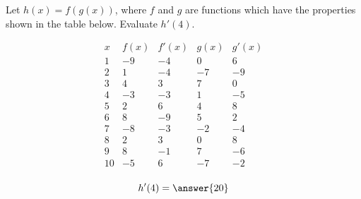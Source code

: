 \documentclass{ximera}
\author{Steven Gubkin}
\begin{document}
\begin{exercise}


Let $h(x) = f(g(x))$, where $f$ and $g$ are functions which have the properties shown in the table below.  Evaluate $h'(4)$.

\[
\begin{array}{c|c|c|c|c}
 x & f(x) & f'(x) & g(x) & g'(x)\\ \hline
1 & -9 & -4 & 0 & 6\\
2 & 1 & -4 & -7 & -9\\
3 & 4 & 3 & 7 & 0\\
4 & -3 & -3 & 1 & -5\\
5 & 2 & 6 & 4 & 8\\
6 & 8 & -9 & 5 & 2\\
7 & -8 & -3 & -2 & -4\\
8 & 2 & 3 & 0 & 8\\
9 & 8 & -1 & 7 & -6\\
10 & -5 & 6 & -7 & -2\\
\end{array}
\]


\begin{prompt}
	$$h'(4) = \answer{20}$$
\end{prompt}


\end{exercise}
\end{document}
